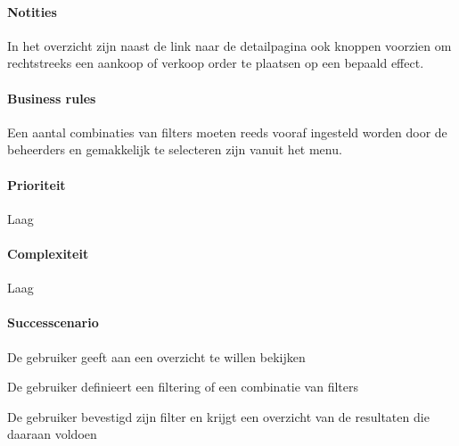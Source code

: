 \begin{compact}
\paragraph{Notities}In het overzicht zijn naast de link naar de detailpagina ook knoppen voorzien om rechtstreeks een aankoop of verkoop order te plaatsen op een bepaald effect.
\paragraph{Business rules}Een aantal combinaties van filters moeten reeds vooraf ingesteld worden door de beheerders en gemakkelijk te selecteren zijn vanuit het menu.
\paragraph{Prioriteit}Laag
\paragraph{Complexiteit}Laag
\paragraph{Successcenario}
\begin{enumerate_compact}
 \item De gebruiker geeft aan een overzicht te willen bekijken
 \item De gebruiker definieert een filtering of een combinatie van filters
 \item De gebruiker bevestigd zijn filter en krijgt een overzicht van de resultaten die daaraan voldoen
\end{enumerate_compact}
\end{compact}

